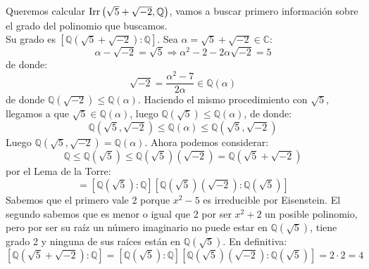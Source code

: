 \begin{ejemplo}
    Queremos calcular $\operatorname{Irr}\left(\sqrt{5}+\sqrt{-2}, \mathbb{Q}\right)$, vamos a buscar primero información sobre el grado del polinomio que buscamos.\\

    \noindent
    Su grado es $\left[\mathbb{Q}(\sqrt{5}+\sqrt{-2}):\mathbb{Q}\right]$. Sea $\alpha = \sqrt{5}+\sqrt{-2}\in \mathbb{C}$: 
    \begin{equation*}
        \alpha-\sqrt{-2} = \sqrt{5} \Longrightarrow \alpha^2 -2 -2\alpha\sqrt{-2} = 5
    \end{equation*}
    de donde:
    \begin{equation*}
        \sqrt{-2} = \dfrac{\alpha^2-7}{2\alpha} \in  \mathbb{Q}(\alpha)
    \end{equation*}
    de donde $\mathbb{Q}(\sqrt{-2}) \leq \mathbb{Q}(\alpha)$. Haciendo el mismo procedimiento con $\sqrt{5}$, llegamos a que $\sqrt{5}\in \mathbb{Q}(\alpha)$, luego $\mathbb{Q}\left(\sqrt{5}\right)\leq \mathbb{Q}(\alpha)$, de donde:
    \begin{equation*}
        \mathbb{Q}\left(\sqrt{5},\sqrt{-2}\right) \leq \mathbb{Q}(\alpha) \leq \mathbb{Q}\left(\sqrt{5},\sqrt{-2}\right)
    \end{equation*}
    Luego $\mathbb{Q}\left(\sqrt{5},\sqrt{-2}\right) = \mathbb{Q}(\alpha)$. Ahora podemos considerar:
    \begin{equation*}
        \mathbb{Q} \leq \mathbb{Q}\left(\sqrt{5}\right) \leq \mathbb{Q}\left(\sqrt{5}\right)\left(\sqrt{-2}\right) = \mathbb{Q}\left(\sqrt{5}+\sqrt{-2}\right)
    \end{equation*}
    por el Lema de la Torre:
    \begin{equation*}
        [\mathbb{Q}(\sqrt{5}+\sqrt{-2}):\mathbb{Q}] = \left[\mathbb{Q}\left(\sqrt{5}\right):\mathbb{Q}\right] \left[\mathbb{Q}\left(\sqrt{5}\right)\left(\sqrt{-2}\right):\mathbb{Q}\left(\sqrt{5}\right)\right]
    \end{equation*}
    Sabemos que el primero vale 2 porque $x^2-5$ es irreducible por Eisenstein. El segundo sabemos que es menor o igual que 2 por ser $x^2+2$ un posible polinomio, pero por ser su raíz un número imaginario no puede estar en $\mathbb{Q}(\sqrt{5})$, tiene grado 2 y ninguna de sus raíces están en $\mathbb{Q}(\sqrt{5})$. En definitiva:
    \begin{equation*}
        \left[\mathbb{Q}(\sqrt{5}+\sqrt{-2}):\mathbb{Q}\right] = \left[\mathbb{Q}\left(\sqrt{5}\right):\mathbb{Q}\right] \left[\mathbb{Q}\left(\sqrt{5}\right)\left(\sqrt{-2}\right):\mathbb{Q}\left(\sqrt{5}\right)\right] = 2\cdot 2 =  4

\end{equation*}
\end{ejemplo}
